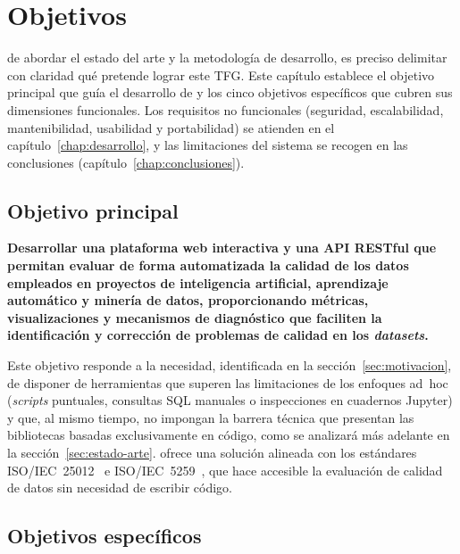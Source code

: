 ﻿\chapter{Objetivos}
\label{chap:objetivos}

 de abordar el estado del arte y la metodología de desarrollo,
es preciso delimitar con claridad qué pretende lograr este \ac{TFG}.  Este
capítulo establece el objetivo principal que guía el desarrollo de
\dataqual y los cinco objetivos específicos que cubren sus dimensiones
funcionales.  Los requisitos no funcionales (seguridad, escalabilidad,
mantenibilidad, usabilidad y portabilidad) se atienden en el
capítulo~\ref{chap:desarrollo}, y las limitaciones del sistema se recogen
en las conclusiones (capítulo~\ref{chap:conclusiones}).


\section{Objetivo principal}
\label{sec:objetivo-general}

\textbf{Desarrollar una plataforma web interactiva y una \ac{API} \ac{REST}ful que
permitan evaluar de forma automatizada la calidad de los datos empleados en
proyectos de inteligencia artificial, aprendizaje automático y minería de
datos, proporcionando métricas, visualizaciones y mecanismos de diagnóstico
que faciliten la identificación y corrección de problemas de calidad en los
\emph{datasets}.}

Este objetivo responde a la necesidad, identificada en la
sección~\ref{sec:motivacion}, de disponer de herramientas que superen las
limitaciones de los enfoques ad~hoc (\emph{scripts} puntuales, consultas
\ac{SQL} manuales o inspecciones en cuadernos Jupyter) y que, al mismo
tiempo, no impongan la barrera técnica que presentan las bibliotecas basadas
exclusivamente en código, como se analizará más adelante en la
sección~\ref{sec:estado-arte}.  \dataqual ofrece una solución
alineada con los estándares
\ac{ISO}/\ac{IEC}~25012~\citep{iso25012} e \ac{ISO}/\ac{IEC}~5259~\citep{iso5259}, que
hace accesible la evaluación de calidad de datos sin necesidad de escribir
código.


\section{Objetivos específicos}
\label{sec:objetivos-especificos}

